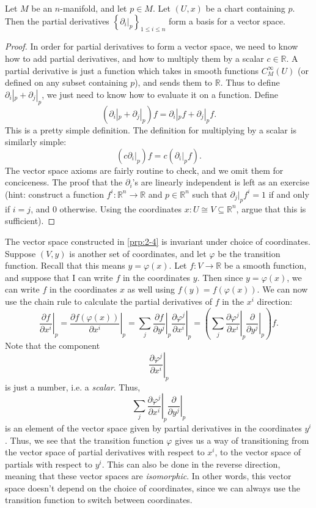 \begin{proposition}\label{prp:2-4}
	Let $M$ be an $n$-manifold, and let $p\in M$. Let $(U,x)$ be a chart containing $p$. Then the partial derivatives $\left\{ \partial _i|_p \right\}_{1\leq i\leq n} $ form a basis for a vector space.
\end{proposition}
\begin{proof}
	In order for partial derivatives to form a vector space, we need to know how to add partial derivatives, and how to multiply them by a scalar $c\in\mathbb{R} $. A partial derivative is just a function which takes in smooth functions $C^\infty _M(U)$ (or defined on any subset containing $p$), and sends them to $\mathbb{R} $. Thus to define $\partial _i|_p + \partial _j|_p$, we just need to know how to evaluate it on a function. Define
	\[
		(\partial _i|_p + \partial _j|_p)f = \partial _i|_pf + \partial _j|_pf
	.\]
	This is a pretty simple definition. The definition for multiplying by a scalar is similarly simple:
	\[
		(c \partial _i|_p)f = c\left( \partial _i|_pf \right) 
	.\]
	The vector space axioms are fairly routine to check, and we omit them for conciceness. The proof that the $\partial _i$'s are linearly independent is left as an exercise (hint: construct a function $f^i : \mathbb{R}^n \to \mathbb{R} $ and $p\in\mathbb{R} ^n$ such that $\partial _j|_pf^i=1$ if and only if $i=j$, and $0$ otherwise. Using the coordinates $x : U \cong V \subseteq \mathbb{R} ^n$, argue that this is sufficient).
\end{proof}

The vector space constructed in \cref{prp:2-4} is invariant under choice of coordinates. Suppose $(V,y)$ is another set of coordinates, and let $\varphi$ be the transition function. Recall that this means $y=\varphi (x)$. Let $f : V \to \mathbb{R} $ be a smooth function, and suppose that I can write $f$ in the coordinates $y$. Then since $y=\varphi (x)$, we can write $f$ in the coordinates $x$ as well using $f(y) = f(\varphi (x))$. We can now use the chain rule to calculate the partial derivatives of $f$ in the $x^i$ direction:
\[
	\left.\frac{\partial f}{\partial x^i}\right|_p = \left.\frac{\partial f(\varphi (x))}{\partial x^i} \right|_p = \sum_{j} \left. \frac{\partial f}{\partial y^j}\right|_p\left. \frac{\partial \varphi ^j}{\partial x^i} \right|_p = \left( \sum_{j} \left. \frac{\partial \varphi ^j}{\partial x^i} \right|_p \left. \frac{\partial }{\partial y^j} \right|_p \right) f
.\]
Note that the component
\[
	\left.\frac{\partial \varphi ^j}{\partial x^i} \right|_p
\]
is just a number, i.e. a \emph{scalar}. Thus,
\[
	\sum_{j} \left. \frac{\partial \varphi ^j}{\partial x^i} \right|_p \left. \frac{\partial }{\partial y^j} \right|_p
\]
is an element of the vector space given by partial derivatives in the coordinates $y^i$. Thus, we see that the transition function $\varphi $ gives us a way of transitioning from the vector space of partial derivatives with respect to $x^i$, to the vector space of partials with respect to $y^i$. This can also be done in the reverse direction, meaning that these vector spaces are \emph{isomorphic}. In other words, this vector space doesn't depend on the choice of coordinates, since we can always use the transition function to switch between coordinates.

